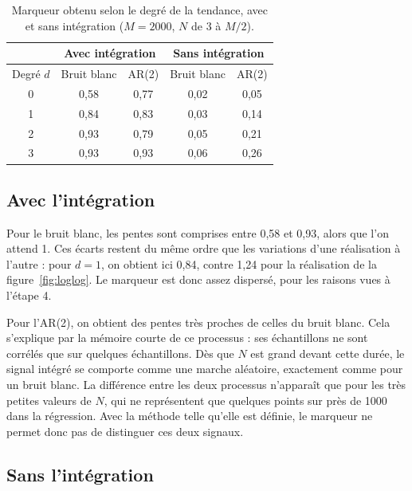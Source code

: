 \documentclass[11pt,a4paper]{article}
\begin{document}
\begin{table}[H]
  \centering
  \begin{tabular}{|c|c|c|c|c|}
    \hline
     & \multicolumn{2}{c|}{Avec intégration} & \multicolumn{2}{c|}{Sans intégration} \\
    \hline
    Degré $d$ & Bruit blanc & AR(2) & Bruit blanc & AR(2) \\
    \hline
    0 & 0,58 & 0,77 & 0,02 & 0,05 \\
    1 & 0,84 & 0,83 & 0,03 & 0,14 \\
    2 & 0,93 & 0,79 & 0,05 & 0,21 \\
    3 & 0,93 & 0,93 & 0,06 & 0,26 \\
    \hline
  \end{tabular}
  \caption{Marqueur obtenu selon le degré de la tendance, avec et sans intégration
  ($M = 2000$, $N$ de 3 à $M/2$).}
  \label{tab:pentes}
\end{table}

\subsection{Avec l'intégration}

Pour le bruit blanc, les pentes sont comprises entre 0,58 et 0,93, alors que l'on attend
1. Ces écarts restent du même ordre que les variations d'une réalisation à l'autre : pour
$d = 1$, on obtient ici 0,84, contre 1,24 pour la réalisation de la
figure~\ref{fig:loglog}. Le marqueur est donc assez dispersé, pour les raisons vues à
l'étape 4.

Pour l'AR(2), on obtient des pentes très proches de celles du bruit blanc. Cela s'explique
par la mémoire courte de ce processus : ses échantillons ne sont corrélés que sur quelques
échantillons. Dès que $N$ est grand devant cette durée, le signal intégré se comporte comme
une marche aléatoire, exactement comme pour un bruit blanc. La différence entre les deux
processus n'apparaît que pour les très petites valeurs de $N$, qui ne représentent que
quelques points sur près de 1000 dans la régression. Avec la méthode telle qu'elle est
définie, le marqueur ne permet donc pas de distinguer ces deux signaux.

\subsection{Sans l'intégration}
\end{document}
